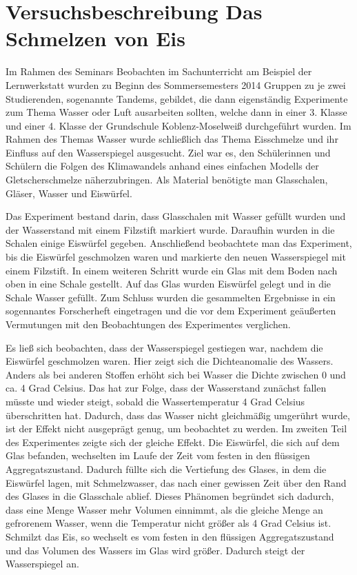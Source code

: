 \section{Versuchsbeschreibung \glqq Das Schmelzen von Eis\grqq{}}
Im Rahmen des Seminars \glqq Beobachten im Sachunterricht am Beispiel der Lernwerkstatt\grqq{} wurden zu Beginn des Sommersemesters 2014 Gruppen zu je zwei Studierenden, sogenannte Tandems, gebildet, die dann eigenständig Experimente zum Thema \glqq Wasser\grqq{} oder \glqq Luft\grqq{} ausarbeiten sollten, welche dann in einer 3. Klasse und einer 4. Klasse der Grundschule Koblenz-Moselweiß durchgeführt wurden.
Im Rahmen des Themas \glqq Wasser\grqq{} wurde schließlich das Thema \glqq Eisschmelze und ihr Einfluss auf den Wasserspiegel\grqq{} ausgesucht.
Ziel war es, den Schülerinnen und Schülern die Folgen des Klimawandels anhand eines einfachen Modells der Gletscherschmelze näherzubringen.
Als Material benötigte man Glasschalen, Gläser, Wasser und Eiswürfel.

Das Experiment bestand darin, dass Glasschalen mit Wasser gefüllt wurden und der Wasserstand mit einem Filzstift markiert wurde.
Daraufhin wurden in die Schalen einige Eiswürfel gegeben.
Anschließend beobachtete man das Experiment, bis die Eiswürfel geschmolzen waren und markierte den neuen Wasserspiegel mit einem Filzstift.
In einem weiteren Schritt wurde ein Glas mit dem Boden nach oben in eine Schale gestellt.
Auf das Glas wurden Eiswürfel gelegt und in die Schale Wasser gefüllt.
Zum Schluss wurden die gesammelten Ergebnisse in ein sogennantes \glqq Forscherheft\grqq{} eingetragen und die vor dem Experiment geäußerten Vermutungen mit den Beobachtungen des Experimentes verglichen.

Es ließ sich beobachten, dass der Wasserspiegel gestiegen war, nachdem die Eiswürfel geschmolzen waren.
Hier zeigt sich die Dichteanomalie des Wassers.
Anders als bei anderen Stoffen erhöht sich bei Wasser die Dichte zwischen 0 und ca. 4 Grad Celsius.
Das hat zur Folge, dass der Wasserstand zunächst fallen müsste und wieder steigt, sobald die Wassertemperatur 4 Grad Celsius überschritten hat.
Dadurch, dass das Wasser nicht gleichmäßig umgerührt wurde, ist der Effekt nicht ausgeprägt genug, um beobachtet zu werden.
Im zweiten Teil des Experimentes zeigte sich der gleiche Effekt.
Die Eiswürfel, die sich auf dem Glas befanden, wechselten im Laufe der Zeit vom festen in den flüssigen Aggregatszustand.
Dadurch füllte sich die Vertiefung des Glases, in dem die Eiswürfel lagen, mit Schmelzwasser, das nach einer gewissen Zeit über den Rand des Glases in die Glasschale ablief.
Dieses Phänomen begründet sich dadurch, dass eine Menge Wasser mehr Volumen einnimmt, als die gleiche Menge an gefrorenem Wasser, wenn die Temperatur nicht größer als 4 Grad Celsius ist.
Schmilzt das Eis, so wechselt es vom festen in den flüssigen Aggregatszustand und das Volumen des Wassers im Glas wird größer.
Dadurch steigt der Wasserspiegel an.

